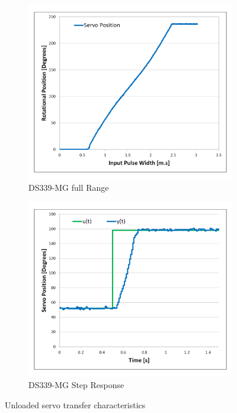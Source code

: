 \begin{figure}[htbp]
\centering
\begin{subfigure}{0.49\textwidth}
\centering
\includegraphics[width=\textwidth]{graphs/servo-range}
\caption{DS339-MG full Range}
\label{fig:servo-range}
\end{subfigure}
\begin{subfigure}{0.49\textwidth}
\centering
\includegraphics[width=\textwidth]{graphs/servo-step}
\caption{DS339-MG Step Response}
\label{fig:servo-step}
\end{subfigure}
\caption{Unloaded servo transfer characteristics}
\label{fig:servo-no-load}
\vspace{-10pt}
\end{figure}
